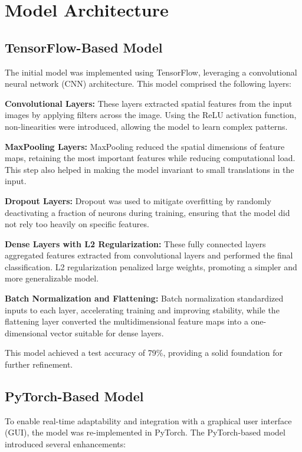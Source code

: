 \documentclass[journal]{IEEEtran}
\begin{document}
\section{Model Architecture}

\subsection{TensorFlow-Based Model}
The initial model was implemented using TensorFlow, leveraging a convolutional neural network (CNN) architecture. This model comprised the following layers:

\textbf{Convolutional Layers:} These layers extracted spatial features from the input images by applying filters across the image. Using the ReLU activation function, non-linearities were introduced, allowing the model to learn complex patterns.

\textbf{MaxPooling Layers:} MaxPooling reduced the spatial dimensions of feature maps, retaining the most important features while reducing computational load. This step also helped in making the model invariant to small translations in the input.

\textbf{Dropout Layers:} Dropout was used to mitigate overfitting by randomly deactivating a fraction of neurons during training, ensuring that the model did not rely too heavily on specific features.

\textbf{Dense Layers with L2 Regularization:} These fully connected layers aggregated features extracted from convolutional layers and performed the final classification. L2 regularization penalized large weights, promoting a simpler and more generalizable model.

\textbf{Batch Normalization and Flattening:} Batch normalization standardized inputs to each layer, accelerating training and improving stability, while the flattening layer converted the multidimensional feature maps into a one-dimensional vector suitable for dense layers.

This model achieved a test accuracy of 79\%, providing a solid foundation for further refinement.

\subsection{PyTorch-Based Model}
To enable real-time adaptability and integration with a graphical user interface (GUI), the model was re-implemented in PyTorch. The PyTorch-based model introduced several enhancements:
\end{document}
